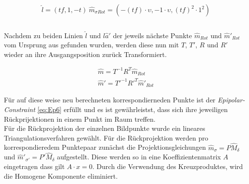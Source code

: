 \begin{gather}
	\hat{l} = (tf, 1, -t)\
	\hat{m}_{\sigma Rot} = (-(tf) \cdot \upsilon , - 1 \cdot \upsilon, (tf)^2 \cdot 1^2 )\\
\end{gather}\\
 
Nachdem zu beiden Linien $\hat{l}$ und $l\hat{a}'$ der jeweils nächste Punkte $\hat{m}_{Rot}$ und $\hat{m}'_{Rot}$ vom Ursprung aus gefunden wurden, werden diese nun mit $T$, $T'$, $R$ und $R'$ wieder an ihre Ausgangsposition zurück Transformiert. 

\begin{gather}
	\hat{m} = T^{-1}R^T\hat{m}_{Rot}\\
	\hat{m}' = T'^{-1}R'^T\hat{m}'_{Rot}
\end{gather}



Für auf diese weise neu berechneten korrespondierneden Punkte ist der \textit{Epipolar-Constraint} \ref{eq:Ep6} erfüllt und es ist gewährleistst, dass sich ihre jeweiligen Rückprijektionen in einem Punkt im Raum treffen.\\

Für die Rückprojektion der einzelnen Bildpunkte wurde ein lineares Triangulationsverfahren gewählt\cite{HZ}. Für die Rückprojektion werden pro korrespondieredem Punktepaar zunächst die Projektionsgleichungen  $\hat{m}_\sigma = P\hat{M}_\delta$ und $\hat{m}'_{\sigma'}  = P'\hat{M}_\delta$ aufgestellt. Diese werden so in eine Koeffizientenmatrix $A$ eingetragen dass gilt $A\cdot x = 0$. Durch die Verwendung des Kreuzproduktes, wird die Homogene Komponente eliminiert\cite{HZ}. 




